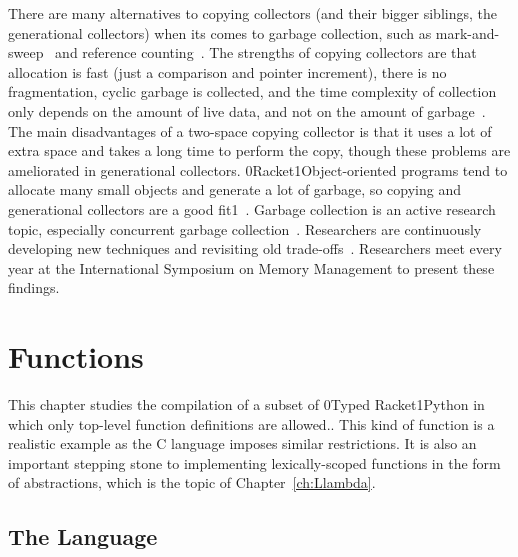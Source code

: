 \documentclass[7x10,nocrop]{TimesAPriori_MIT}%
\def\racketEd{0}
\def\pythonEd{1}
\def\edition{1}
\newcommand{\racket}[1]{{\if\edition\racketEd{#1}\fi}}
\newcommand{\python}[1]{{\if\edition\pythonEd #1\fi}}
\begin{document}
There are many alternatives to copying collectors (and their bigger
siblings, the generational collectors) when its comes to garbage
collection, such as mark-and-sweep~\citep{McCarthy:1960dz} and
reference counting~\citep{Collins:1960aa}.  The strengths of copying
collectors are that allocation is fast (just a comparison and pointer
increment), there is no fragmentation, cyclic garbage is collected,
and the time complexity of collection only depends on the amount of
live data, and not on the amount of garbage~\citep{Wilson:1992fk}. The
main disadvantages of a two-space copying collector is that it uses a
lot of extra space and takes a long time to perform the copy, though
these problems are ameliorated in generational collectors.
\racket{Racket}\python{Object-oriented} programs tend to allocate many
small objects and generate a lot of garbage, so copying and
generational collectors are a good fit\python{~\citep{Dieckmann99}}.
Garbage collection is an active research topic, especially concurrent
garbage collection~\citep{Tene:2011kx}. Researchers are continuously
developing new techniques and revisiting old
trade-offs~\citep{Blackburn:2004aa,Jones:2011aa,Shahriyar:2013aa,Cutler:2015aa,Shidal:2015aa,Osterlund:2016aa,Jacek:2019aa,Gamari:2020aa}. Researchers
meet every year at the International Symposium on Memory Management to
present these findings.


\chapter{Functions}
\label{ch:Lfun}

This chapter studies the compilation of  a subset of \racket{Typed
  Racket}\python{Python} in which only top-level function definitions
are allowed..
This kind of function is a realistic example as the C language imposes
similar restrictions. It is also  an important stepping stone to
implementing lexically-scoped functions in the form of 
abstractions, which is the topic of Chapter~\ref{ch:Llambda}.

\section{The \LangFun{} Language}
\end{document}
